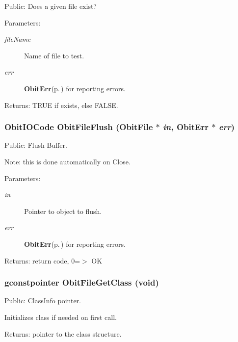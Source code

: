 Public: Does a given file exist? 

\begin{Desc}
\item[Parameters:]
\begin{description}
\item[{\em file\-Name}]Name of file to test. \item[{\em err}]{\bf Obit\-Err}{\rm (p.\,\pageref{structObitErr})} for reporting errors. \end{description}
\end{Desc}
\begin{Desc}
\item[Returns:]TRUE if exists, else FALSE. \end{Desc}
\subsubsection{\setlength{\rightskip}{0pt plus 5cm}Obit\-IOCode Obit\-File\-Flush ({\bf Obit\-File} $\ast$ {\em in}, {\bf Obit\-Err} $\ast$ {\em err})}\label{ObitFile_8h_a39}


Public: Flush Buffer. 

Note: this is done automatically on Close. \begin{Desc}
\item[Parameters:]
\begin{description}
\item[{\em in}]Pointer to object to flush. \item[{\em err}]{\bf Obit\-Err}{\rm (p.\,\pageref{structObitErr})} for reporting errors. \end{description}
\end{Desc}
\begin{Desc}
\item[Returns:]return code, 0=$>$ OK \end{Desc}
\subsubsection{\setlength{\rightskip}{0pt plus 5cm}gconstpointer Obit\-File\-Get\-Class (void)}\label{ObitFile_8h_a24}


Public: Class\-Info pointer. 

Initializes class if needed on first call. \begin{Desc}
\item[Returns:]pointer to the class structure. \end{Desc}
